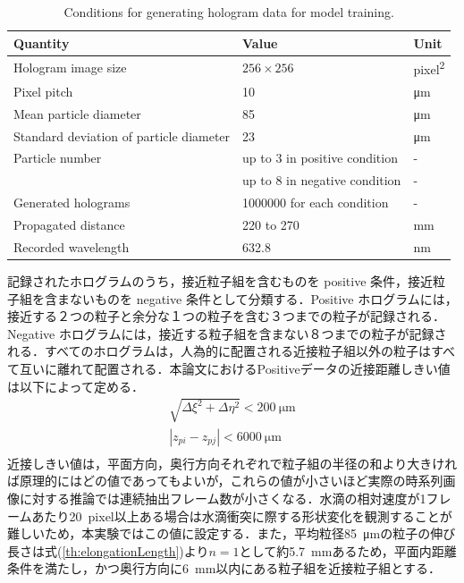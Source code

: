 \begin{table}[H]
    \centering
    \caption{Conditions for generating hologram data for model training.}
    \label{table:trainingData}
    \begin{tabular}{lll}
    Quantity & Value & Unit \\ \hline \hline
    Hologram image size & $\num{256} \times \num{256}$ & \si{pixel\squared} \\ \hline
    Pixel pitch & \num{10} & \si{\um} \\ \hline
    Mean particle diameter & \num{85} & \si{\um} \\ \hline 
    Standard deviation of particle diameter & \num{23} & \si{\um} \\ \hline
    Particle number & up to 3 in positive condition & - \\
    & up to 8 in negative condition & - \\ \hline
    Generated holograms & \num{1000000} for each condition & - \\ \hline
    Propagated distance & \num{220} to \num{270} & \si{\mm} \\ \hline
    Recorded wavelength & \num{632.8} & \si{\nm} \\ \hline
    \end{tabular}
\end{table}

記録されたホログラムのうち，接近粒子組を含むものを positive 条件，接近粒子組を含まないものを negative 条件として分類する．Positive ホログラムには，接近する２つの粒子と余分な１つの粒子を含む３つまでの粒子が記録される．Negative ホログラムには，接近する粒子組を含まない８つまでの粒子が記録される．すべてのホログラムは，人為的に配置される近接粒子組以外の粒子はすべて互いに離れて配置される．本論文におけるPositiveデータの近接距離しきい値は以下によって定める．
\begin{gather}
    \sqrt{\Delta \xi^2 + \Delta \eta^2} < \SI{200}{\um} \\
    |z_{pi}-z_{pj}| < \SI{6000}{\um} \\
\end{gather}
近接しきい値は，平面方向，奥行方向それぞれで粒子組の半径の和より大きければ原理的にはどの値であってもよいが，これらの値が小さいほど実際の時系列画像に対する推論では連続抽出フレーム数が小さくなる．水滴の相対速度が1フレームあたり\SI{20}{pixel}以上ある場合は水滴衝突に際する形状変化を観測することが難しいため，本実験ではこの値に設定する．また，平均粒径\SI{85}{\um}の粒子の伸び長さは式(\ref{th:elongationLength})より$n=1$として約\SI{5.7}{\mm}あるため，平面内距離条件を満たし，かつ奥行方向に\SI{6}{\mm}以内にある粒子組を近接粒子組とする．

